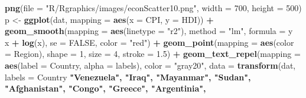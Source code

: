 \documentclass[]{book}
\newenvironment{Shaded}{\begin{snugshade}}{\end{snugshade}}
\newcommand{\KeywordTok}[1]{\textcolor[rgb]{0.13,0.29,0.53}{\textbf{#1}}}
\newcommand{\DataTypeTok}[1]{\textcolor[rgb]{0.13,0.29,0.53}{#1}}
\newcommand{\DecValTok}[1]{\textcolor[rgb]{0.00,0.00,0.81}{#1}}
\newcommand{\FloatTok}[1]{\textcolor[rgb]{0.00,0.00,0.81}{#1}}
\newcommand{\StringTok}[1]{\textcolor[rgb]{0.31,0.60,0.02}{#1}}
\newcommand{\OtherTok}[1]{\textcolor[rgb]{0.56,0.35,0.01}{#1}}
\newcommand{\OperatorTok}[1]{\textcolor[rgb]{0.81,0.36,0.00}{\textbf{#1}}}
\newcommand{\NormalTok}[1]{#1}
\begin{document}
\begin{Shaded}
\begin{Highlighting}[]
\KeywordTok{png}\NormalTok{(}\DataTypeTok{file =} \StringTok{"R/Rgraphics/images/econScatter10.png"}\NormalTok{, }\DataTypeTok{width =} \DecValTok{700}\NormalTok{, }\DataTypeTok{height =} \DecValTok{500}\NormalTok{)}
\NormalTok{p <-}\StringTok{ }\KeywordTok{ggplot}\NormalTok{(dat,}
            \DataTypeTok{mapping =} \KeywordTok{aes}\NormalTok{(}\DataTypeTok{x =}\NormalTok{ CPI, }\DataTypeTok{y =}\NormalTok{ HDI)) }\OperatorTok{+}
\StringTok{  }\KeywordTok{geom_smooth}\NormalTok{(}\DataTypeTok{mapping =} \KeywordTok{aes}\NormalTok{(}\DataTypeTok{linetype =} \StringTok{"r2"}\NormalTok{),}
              \DataTypeTok{method =} \StringTok{"lm"}\NormalTok{,}
              \DataTypeTok{formula =}\NormalTok{ y }\OperatorTok{~}\StringTok{ }\NormalTok{x }\OperatorTok{+}\StringTok{ }\KeywordTok{log}\NormalTok{(x), }\DataTypeTok{se =} \OtherTok{FALSE}\NormalTok{,}
              \DataTypeTok{color =} \StringTok{"red"}\NormalTok{) }\OperatorTok{+}
\StringTok{  }\KeywordTok{geom_point}\NormalTok{(}\DataTypeTok{mapping =} \KeywordTok{aes}\NormalTok{(}\DataTypeTok{color =}\NormalTok{ Region),}
             \DataTypeTok{shape =} \DecValTok{1}\NormalTok{,}
             \DataTypeTok{size =} \DecValTok{4}\NormalTok{,}
             \DataTypeTok{stroke =} \FloatTok{1.5}\NormalTok{) }\OperatorTok{+}
\StringTok{  }\KeywordTok{geom_text_repel}\NormalTok{(}\DataTypeTok{mapping =} \KeywordTok{aes}\NormalTok{(}\DataTypeTok{label =}\NormalTok{ Country, }\DataTypeTok{alpha =}\NormalTok{ labels),}
                  \DataTypeTok{color =} \StringTok{"gray20"}\NormalTok{,}
                  \DataTypeTok{data =} \KeywordTok{transform}\NormalTok{(dat,}
                                   \DataTypeTok{labels =}\NormalTok{ Country }\OperatorTok{%
                                                           \StringTok{"Venezuela"}\NormalTok{,}
                                                           \StringTok{"Iraq"}\NormalTok{,}
                                                           \StringTok{"Mayanmar"}\NormalTok{,}
                                                           \StringTok{"Sudan"}\NormalTok{,}
                                                           \StringTok{"Afghanistan"}\NormalTok{,}
                                                           \StringTok{"Congo"}\NormalTok{,}
                                                           \StringTok{"Greece"}\NormalTok{,}
                                                           \StringTok{"Argentinia"}\NormalTok{,}
}
\end{Highlighting}
\end{Shaded}
\end{document}

